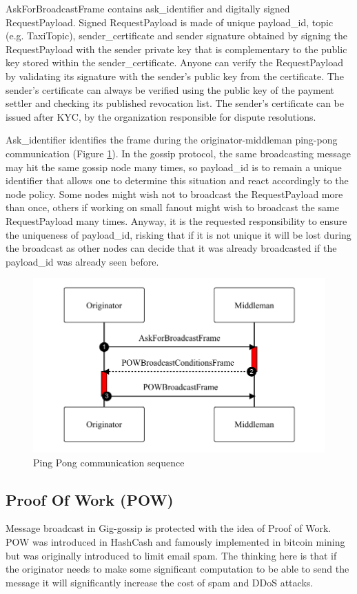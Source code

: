 \documentclass{article}
\begin{document}
AskForBroadcastFrame contains ask\_identifier and digitally signed RequestPayload. Signed RequestPayload is made of unique payload\_id, topic (e.g. TaxiTopic), sender\_certificate and sender signature obtained by signing the RequestPayload with the sender private key that is complementary to the public key stored within the sender\_certificate. Anyone can verify the RequestPayload by validating its signature with the sender's public key from the certificate. The sender's certificate can always be verified using the public key of the payment settler and checking its published revocation list. The sender's certificate can be issued after KYC, by the organization responsible for dispute resolutions.

Ask\_identifier identifies the frame during the originator-middleman ping-pong communication (Figure \ref{fig:fr:pingpong}). In the gossip protocol, the same broadcasting message may hit the same gossip node many times, so payload\_id is to remain a unique identifier that allows one to determine this situation and react accordingly to the node policy. Some nodes might wish not to broadcast the RequestPayload more than once, others if working on small fanout might wish to broadcast the same RequestPayload many times. Anyway, it is the requested responsibility to ensure the uniqueness of payload\_id, risking that if it is not unique it will be lost during the broadcast as other nodes can decide that it was already broadcasted if the payload\_id was already seen before.


\begin{figure}
	\centering
	\includegraphics[scale=0.7]{PingPong.pdf}
	\caption{Ping Pong communication sequence}
	\label{fig:fr:pingpong}
\end{figure}

\subsection{Proof Of Work (POW)}
Message broadcast in Gig-gossip is protected with the idea of Proof of Work. POW was introduced in HashCash \cite{Hashcash} and famously implemented in bitcoin mining but was originally introduced to limit email spam. The thinking here is that if the originator needs to make some significant computation to be able to send the message it will significantly increase the cost of spam and DDoS attacks. 
\end{document}
